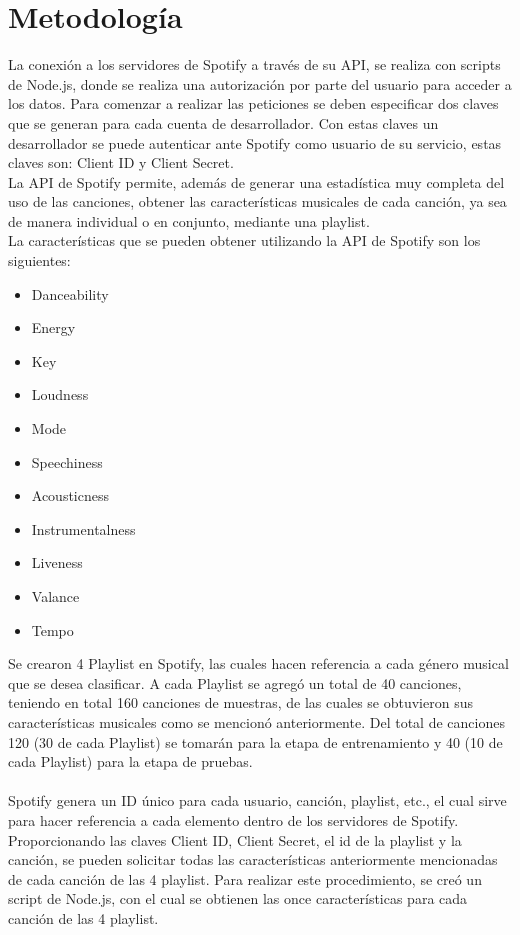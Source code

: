 \documentclass[conference]{IEEEtran}
\begin{document}
\section{Metodolog\'ia}
La conexión a los servidores de Spotify a través de su API, se realiza con scripts de Node.js, donde se realiza una autorización por parte del usuario para acceder a los datos. Para comenzar a realizar las peticiones se deben especificar dos claves que se generan para cada cuenta de desarrollador. Con estas claves un desarrollador se puede autenticar ante Spotify como usuario de su servicio, estas claves son: Client ID y Client Secret.\\

La API de Spotify permite, además de generar una estadística muy completa del uso de las canciones, obtener las características musicales de cada canción, ya sea de manera individual o en conjunto, mediante una playlist.\\
La características que se pueden obtener utilizando la API de Spotify son los siguientes: \\

\begin{itemize}
	\item Danceability
	\item Energy
	\item Key
	\item Loudness
	\item Mode
	\item Speechiness
	\item Acousticness
	\item Instrumentalness
	\item Liveness
	\item Valance
	\item Tempo \\
\end{itemize}

Se crearon 4 Playlist en Spotify, las cuales hacen referencia a cada género musical que se desea clasificar. A cada Playlist se agregó un total de 40 canciones, teniendo en total 160 canciones de muestras, de las cuales se obtuvieron sus características musicales como se mencionó anteriormente. Del total de canciones 120 (30 de cada Playlist) se tomarán para la etapa de entrenamiento y 40 (10 de cada Playlist) para la etapa de pruebas.\\\\
Spotify genera un ID único para cada usuario, canción, playlist, etc., el cual sirve para hacer referencia a cada elemento dentro de los servidores de Spotify. Proporcionando las claves Client ID, Client Secret, el id de la playlist y la canción, se pueden solicitar todas las características anteriormente mencionadas de cada canción de las 4 playlist. Para realizar este procedimiento, se creó un script de Node.js, con el cual se obtienen las once características para cada canción de las 4 playlist.\\
\end{document}
